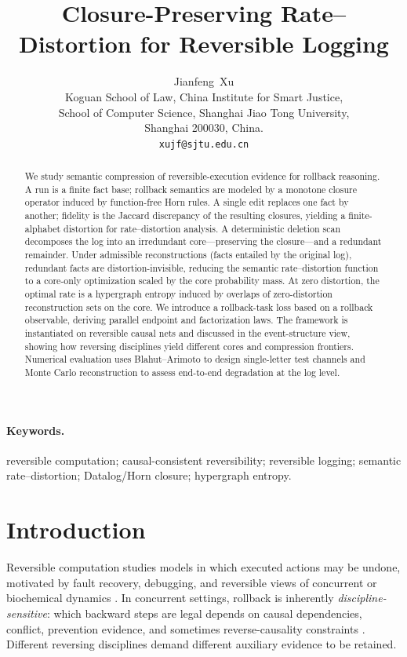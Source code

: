 \documentclass[twoside]{article}
\title{Closure-Preserving Rate--Distortion for Reversible Logging}
\author{Jianfeng~Xu \\ Koguan School of Law, China Institute for Smart Justice,\\
School of Computer Science, Shanghai Jiao Tong University,\\ Shanghai 200030, China. \\ \texttt{xujf@sjtu.edu.cn}}
\date{}
\newcommand{\1}{\mathbf{1}}
\begin{document}
\maketitle

\begin{abstract}
We study semantic compression of reversible-execution evidence for rollback reasoning. 
A run is a finite fact base; rollback semantics are modeled by a monotone closure operator induced by function-free Horn rules. 
A single edit replaces one fact by another; fidelity is the Jaccard discrepancy of the resulting closures, yielding a finite-alphabet distortion for rate–distortion analysis. 
A deterministic deletion scan decomposes the log into an irredundant core—preserving the closure—and a redundant remainder. 
Under admissible reconstructions (facts entailed by the original log), redundant facts are distortion-invisible, reducing the semantic rate–distortion function to a core-only optimization scaled by the core probability mass. 
At zero distortion, the optimal rate is a hypergraph entropy induced by overlaps of zero-distortion reconstruction sets on the core. 
We introduce a rollback-task loss based on a rollback observable, deriving parallel endpoint and factorization laws. 
The framework is instantiated on reversible causal nets and discussed in the event-structure view, showing how reversing disciplines yield different cores and compression frontiers. 
Numerical evaluation uses Blahut–Arimoto to design single-letter test channels and Monte Carlo reconstruction to assess end-to-end degradation at the log level.
\end{abstract}

\paragraph{Keywords.}
reversible computation; causal-consistent reversibility; reversible logging;
semantic rate--distortion; Datalog/Horn closure; hypergraph entropy.



\section{Introduction}
\label{sec:intro}

Reversible computation studies models in which executed actions may be undone,
motivated by fault recovery, debugging, and reversible views of concurrent or
biochemical dynamics \cite{toffoli1977computation,fredkin1982conservative,
danos2004reversible,ulidowski2018reversing}.
In concurrent settings, rollback is inherently \emph{discipline-sensitive}:
which backward steps are legal depends on causal dependencies, conflict,
prevention evidence, and sometimes reverse-causality constraints
\cite{lanese2024axiomatic,aubert2025independence,melgratti2024reversible}.
Different reversing disciplines demand different auxiliary evidence to be retained.
\end{document}
